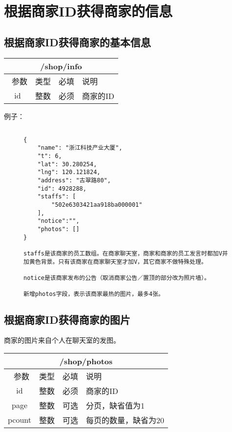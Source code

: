 \documentclass[cs4size]{ctexartutf8}
\begin{document}
\section{根据商家ID获得商家的信息}
\subsection{根据商家ID获得商家的基本信息}

\begin{table}[H]
   \begin{center}
\begin{tabular}{|c|c|c|p{12cm}|}
\hline
\multicolumn{4}{|c|}{/shop/info} \\
\hline\hline
 \  参数  & 类型 & 必填 &  说明  \\
\hline
 id  & 整数 & 必须 & 商家的ID\\
\hline
\end{tabular}
   \end{center}
\end{table}

例子：

\begin{figure}[H]
\begin{verbatim}

{
    "name": "浙江科技产业大厦",
    "t": 6,
    "lat": 30.280254,
    "lng": 120.121824,
    "address": "古翠路80",
    "id": 4928288,
    "staffs": [
        "502e6303421aa918ba000001"
    ],
    "notice":"",
    "photos": []
}

staffs是该商家的员工数组。在商家聊天室，商家和商家的员工发言时都加V并加黄色背景。只有该商家在商家聊天室才加V，其它商家不做特殊处理。

notice是该商家发布的公告（取消商家公告／置顶的部分改为照片墙）。

新增photos字段，表示该商家最热的图片，最多4张。

\end{verbatim}
\end{figure}



\subsection{根据商家ID获得商家的图片}
商家的图片来自个人在聊天室的发图。

\begin{table}[H]
   \begin{center}
\begin{tabular}{|c|c|c|p{12cm}|}
\hline
\multicolumn{4}{|c|}{/shop/photos} \\
\hline\hline
 \  参数  & 类型 & 必填 &  说明  \\
\hline
 id  & 整数 & 必须 & 商家的ID\\
   \hline
 page  & 整数 & 可选 & 分页，缺省值为1\\ 
 \hline
 pcount  & 整数 & 可选 & 每页的数量，缺省为20\\ 
\hline
\end{tabular}
   \end{center}
\end{table}
\end{document}
